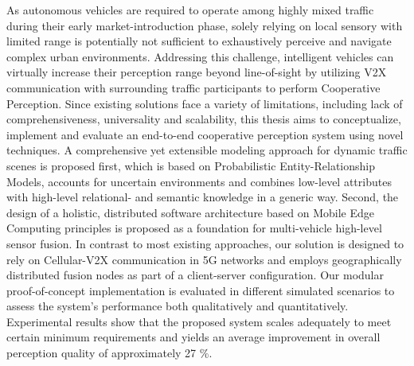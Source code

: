 As autonomous vehicles are required to operate among highly mixed traffic during their early market-introduction phase, solely relying on local sensory with limited range is potentially not sufficient to exhaustively perceive and navigate complex urban environments. Addressing this challenge, intelligent vehicles can virtually increase their perception range beyond line-of-sight by utilizing V2X communication with surrounding traffic participants to perform Cooperative Perception. Since existing solutions face a variety of limitations, including lack of comprehensiveness, universality and scalability, this thesis aims to conceptualize, implement and evaluate an end-to-end cooperative perception system using novel techniques. A comprehensive yet extensible modeling approach for dynamic traffic scenes is proposed first, which is based on Probabilistic Entity-Relationship Models, accounts for uncertain environments and combines low-level attributes with high-level relational- and semantic knowledge in a generic way. Second, the design of a holistic, distributed software architecture based on Mobile Edge Computing principles is proposed as a foundation for multi-vehicle high-level sensor fusion. In contrast to most existing approaches, our solution is designed to rely on Cellular-V2X communication in 5G networks and employs geographically distributed fusion nodes as part of a client-server configuration. Our modular proof-of-concept implementation is evaluated in different simulated scenarios to assess the system's performance both qualitatively and quantitatively. Experimental results show that the proposed system scales adequately to meet certain minimum requirements and yields an average improvement in overall perception quality of approximately 27 \%.